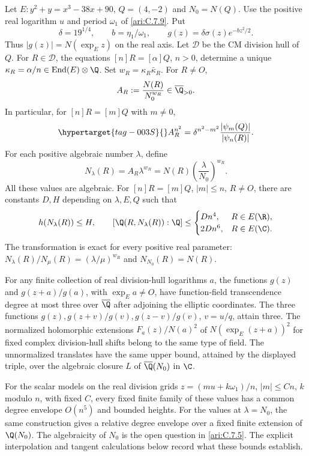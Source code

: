 \begin{proposition}\hypertarget{tag-001A}{}\label{ari:C.7.12}

Let $E:y^2+y=x^3-38x+90$, $Q=(4,-2)$ and $N_0=N(Q)$.
Use the positive real logarithm $u$ and period $\omega_1$ of
\ref{ari:C.7.9}. Put
\[
 \delta=19^{1/4},\qquad b=\eta_1/\omega_1,\qquad
 g(z)=\delta\sigma(z)e^{-bz^2/2}.
\]
Thus $|g(z)|=N(\exp_Ez)$ on the real axis. Let $\mathcal D$
be the CM division hull of $Q$. For $R\in\mathcal D$, the
equations $[n]R=[\alpha]Q$, $n>0$, determine a unique
$\kappa_R=\alpha/n\in\operatorname{End}(E)\otimes\Q$.
Set $w_R=\kappa_R\bar\kappa_R$. For $R\ne O$,
\[
 A_R:=\frac{N(R)}{N_0^{w_R}}\in\overline\Q_{>0}.
\]
In particular, for $[n]R=[m]Q$ with $m\ne0$,
\begin{equation}\hypertarget{tag-003S}{}\label{ari:eq:division-ratio-model}
 A_R^{n^2}=\delta^{n^2-m^2}
                  \frac{|\psi_m(Q)|}{|\psi_n(R)|}.
\end{equation}
For each positive algebraic number $\lambda$, define
\[
 N_\lambda(R)=A_R\lambda^{w_R}
       =N(R)\left(\frac{\lambda}{N_0}\right)^{w_R}.
\]
All these values are algebraic. For $[n]R=[m]Q$, $|m|\le n$,
$R\ne O$, there are constants $D,H$ depending on $\lambda,E,Q$
such that
\[
 h(N_\lambda(R))\le H,\qquad
 [\Q(R,N_\lambda(R)):\Q]\le
 \begin{cases}Dn^4,&R\in E(\R),\\2Dn^6,&R\in E(\C).
 \end{cases}
\]
The transformation is exact for every positive real parameter:
$N_\lambda(R)/N_\mu(R)=(\lambda/\mu)^{w_R}$ and
$N_{N_0}(R)=N(R)$.

For any finite collection of real division-hull logarithms $a$,
the functions $g(z)$ and $g(z+a)/g(a)$, with $\exp_Ea\ne O$,
have function-field transcendence degree at most three over
$\overline\Q$ after adjoining the elliptic coordinates.
The three functions $g(z),g(z+v)/g(v),g(z-v)/g(v)$, $v=u/q$,
attain three. The normalized holomorphic extensions
$F_a(z)/N(a)^2$ of $N(\exp_E(z+a))^2$ for fixed complex
division-hull shifts belong to the same type of field.
The unnormalized translates have the same upper bound, attained by
the displayed triple, over the algebraic closure $L$ of $\overline\Q(N_0)$ in $\C$.

For the scalar models on the real division grids
$z=(mu+k\omega_1)/n$, $|m|\le Cn$, $k$ modulo $n$, with
fixed $C$, every fixed finite family of these values has a common
degree envelope $O(n^5)$ and bounded heights. For the values at $\lambda=N_0$, the same construction
gives a relative degree envelope over a fixed finite extension
of $\Q(N_0)$. The algebraicity of $N_0$ is the open question in
\cref{ari:C.7.5}. The explicit interpolation and tangent
calculations below record what these bounds establish.
\end{proposition}

